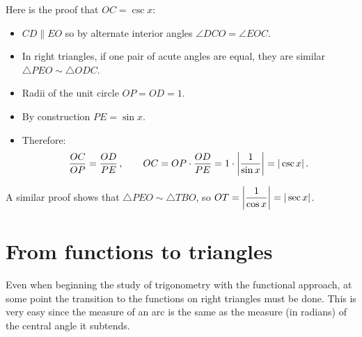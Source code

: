 Here is the proof that $OC=\csc x$:
\begin{itemize}
\item $CD \parallel EO$ so by alternate interior angles $\angle DCO=\angle EOC$.
\item In right triangles, if one pair of acute angles are equal, they are similar $\triangle PEO \sim \triangle ODC$.
\item Radii of the unit circle $OP = OD =1$.
\item By construction $PE = \sin x$.
\item Therefore:
\[
\frac{OC}{OP} = \frac{OD}{PE}\,, \quad\quad OC = OP\cdot\frac{OD}{PE}=1\cdot\left|\displaystyle\frac{1}{\sin x}\right|=|\csc x|\,.
\]
\end{itemize}
A similar proof shows that $\triangle PEO \sim \triangle TBO$, so $OT = \left|\displaystyle\frac{1}{\cos x}\right|=|\sec x|$.



\section{From functions to triangles}

Even when beginning the study of trigonometry with the functional approach, at some point the transition to the functions on right triangles must be done.
This is very easy since the measure of an arc is the same as the measure (in radians) of the central angle it subtends.

